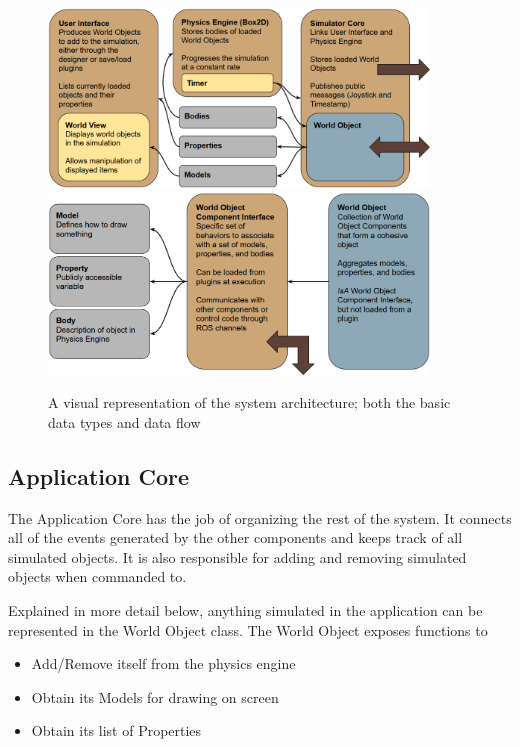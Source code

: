 \begin{figure}[tbh]
\begin{center}
\includegraphics[width=0.9\textwidth]{./images_design/sysarch2_flow}
\includegraphics[width=0.9\textwidth]{./images_design/sysarch2_datatypes}
\end{center}
\caption{A visual representation of the system architecture; both the basic data types and data flow\label{fig:systemdiagram}}
\end{figure}

\subsection{Application Core}
The Application Core has the job of organizing the rest of the system. It connects all of the events generated by the other components and keeps track of all simulated objects. It is also responsible for adding and removing simulated objects when commanded to.

Explained in more detail below, anything simulated in the application can be represented in the World Object class. The World Object exposes functions to
\begin{itemize}
	\item Add/Remove itself from the physics engine
	\item Obtain its Models for drawing on screen
	\item Obtain its list of Properties
\end{itemize}

